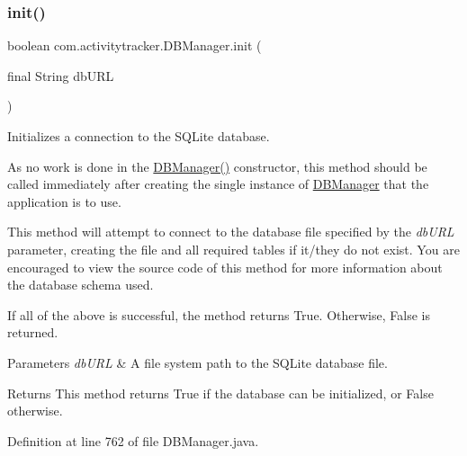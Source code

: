 \subsubsection{\texorpdfstring{init()}{init()}}
{\footnotesize\ttfamily boolean com.\+activitytracker.\+D\+B\+Manager.\+init (\begin{DoxyParamCaption}\item[{final String}]{db\+U\+RL }\end{DoxyParamCaption})\hspace{0.3cm}{\ttfamily [package]}}

Initializes a connection to the S\+Q\+Lite database.

As no work is done in the \mbox{\hyperlink{classcom_1_1activitytracker_1_1_d_b_manager_ac1f558ef56fe02d74fe103a473a15bb5}{D\+B\+Manager()}} constructor, this method should be called immediately after creating the single instance of \mbox{\hyperlink{classcom_1_1activitytracker_1_1_d_b_manager}{D\+B\+Manager}} that the application is to use.

This method will attempt to connect to the database file specified by the {\itshape db\+U\+RL} parameter, creating the file and all required tables if it/they do not exist. You are encouraged to view the source code of this method for more information about the database schema used.

If all of the above is successful, the method returns True. Otherwise, False is returned.


\begin{DoxyParams}{Parameters}
{\em db\+U\+RL} & A file system path to the S\+Q\+Lite database file.\\
\hline
\end{DoxyParams}
\begin{DoxyReturn}{Returns}
This method returns True if the database can be initialized, or False otherwise. 
\end{DoxyReturn}


Definition at line 762 of file D\+B\+Manager.\+java.


